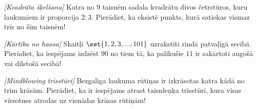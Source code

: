\begin{problem}
\textit{[Kvadrāta šķelšana]}
Katra no $9$ taisnēm sadala kvadrātu divos četrstūros, kuru laukumiem ir proporcija $2:3$. Pierādiet, ka eksistē punkts, kurā satiekas vismaz trīs no šīm taisnēm!
\end{problem}
%

\begin{problem}
\textit{[Kārtība no haosa]}
Skaitļi $\set{1,2,3,...,101}$ uzrakstīti rindā patvaļīgā secībā. Pierādiet, ka iespējams izdzēst $90$ no tiem tā, ka palikušie $11$ ir sakārtoti  augošā vai dilstošā secībā!
\end{problem}
%

\begin{problem}
\textit{[Mindblowing trīsstūri]}
Bezgalīga laukuma rūtiņas ir izkrāsotas katra kādā no trim krāsām. Pierādiet, ka ir iespējams atrast taisnleņķa trīsstūri, kura visas virsotnes atrodas uz vienādas krāsas rūtiņām!
\end{problem}
%

